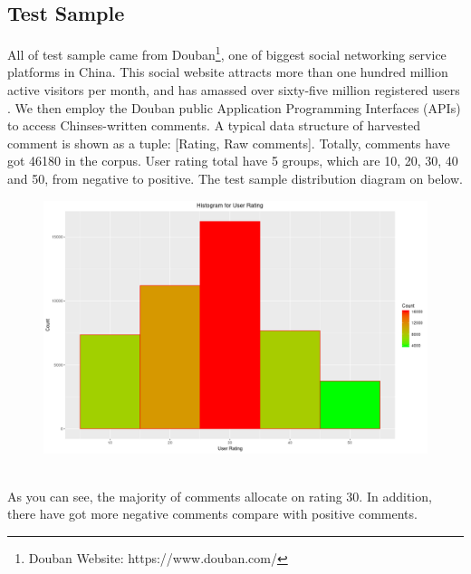 \documentclass[conference]{IEEEtran}
\begin{document}
\begin{CJK*}{UTF8}{gbsn}
\subsection{Test Sample}
All of test sample came from Douban\footnote{Douban Website:
  https://www.douban.com/}, one of biggest social networking service
platforms in China. This social website attracts more than one hundred million
active visitors per month, and has amassed over sixty-five million registered
users \cite{doubanStat}. We then employ the Douban public Application Programming Interfaces
(APIs) to access Chinses-written comments. A typical data structure of harvested
comment is shown as a tuple: [Rating, Raw comments]. Totally, comments have got
46180 in the corpus. User rating total have 5 groups, which are 10, 20, 30, 40
and 50, from negative to positive.
The test sample distribution diagram on below.\\
\begin{figure}
  \centering
  \includegraphics[width=0.3\paperwidth]{./img/ratingHis.png}
  \label{fig:userRatingHistogram}
\end{figure}\\

As you can see, the majority of comments allocate on rating 30. In addition,
there have got more negative comments compare with positive comments.


\end{CJK*}
\end{document}
